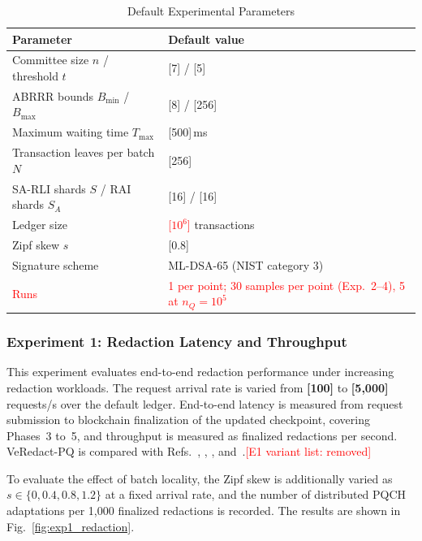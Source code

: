 \documentclass[lettersize,journal]{IEEEtran}
\begin{document}
    \begin{table}[t]
    \centering
    \caption{Default Experimental Parameters}
    \label{tab:params}
    \scriptsize
    \renewcommand{\arraystretch}{1.08}
    \setlength{\tabcolsep}{4pt}
    \begin{tabular}{ll}
    \hline
    \textbf{Parameter} & \textbf{Default value} \\
    \hline
    Committee size $n$ / threshold $t$ & [7] / [5] \\
    ABRRR bounds $B_{\min}$ / $B_{\max}$ & [8] / [256] \\
    Maximum waiting time $T_{\max}$ & [500]\,ms \\
    Transaction leaves per batch $N$ & [256] \\
    SA-RLI shards $S$ / RAI shards $S_A$ & [16] / [16] \\
    Ledger size & \textcolor{red}{[$10^6$]} transactions \\
    Zipf skew $s$ & [0.8] \\
    Signature scheme & ML-DSA-65 (NIST category 3) \\
    \textcolor{red}{Runs} & \textcolor{red}{1 per point; 30 samples per point (Exp.~2--4), 5 at $n_Q=10^5$} \\
    \hline
    \end{tabular}
    \end{table}
    
    \subsubsection*{\textbf{Experiment 1: Redaction Latency and Throughput}}
    
    This experiment evaluates end-to-end redaction performance under
    increasing redaction workloads. The request arrival rate is varied from
    \textbf{[100]} to \textbf{[5,000]} requests/s over the default ledger.
    End-to-end latency is measured from request submission to blockchain
    finalization of the updated checkpoint, covering Phases~3 to~5, and
    throughput is measured as finalized redactions per second. VeRedact-PQ
    is compared with Refs.~\cite{ref1}, \cite{ref13}, \cite{ref27},
    and~\cite{ref34}.\textcolor{red}{\textsf{\footnotesize[E1 variant list: removed]}}
    
    To evaluate the effect of batch locality, the Zipf skew is additionally
    varied as $s\in\{0,0.4,0.8,1.2\}$ at a fixed arrival rate, and the
    number of distributed PQCH adaptations per 1,000 finalized redactions is
    recorded. The results are shown in Fig.~\ref{fig:exp1_redaction}.
    
\end{document}
